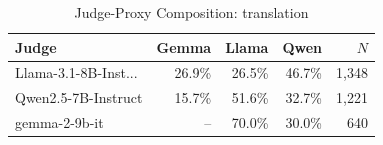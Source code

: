 \begin{table}[htbp]
\centering
\caption{Judge-Proxy Composition: translation}
\label{tab:composition_translation}
\begin{tabular}{lrrrr}
\toprule
Judge & Gemma & Llama & Qwen & $N$ \\
\midrule
Llama-3.1-8B-Inst... & 26.9\% & 26.5\% & 46.7\% & 1,348 \\
Qwen2.5-7B-Instruct & 15.7\% & 51.6\% & 32.7\% & 1,221 \\
gemma-2-9b-it & -- & 70.0\% & 30.0\% & 640 \\
\bottomrule
\end{tabular}
\end{table}